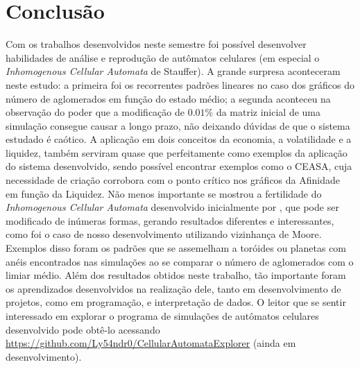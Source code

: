 \documentclass[
	12pt,				%
	openright,			%
	twoside,			%
	a4paper,			%
	english,			%
	french,				%
	spanish,			%
	brazil				%
	]{abntex2}
\begin{document}

\chapter{Conclusão}

Com os trabalhos desenvolvidos neste semestre foi possível desenvolver habilidades de análise e reprodução de autômatos celulares (em especial o \textit{Inhomogenous Cellular Automata} de Stauffer). A grande surpresa aconteceram neste estudo: a primeira foi os recorrentes padrões lineares no caso dos gráficos do número de aglomerados em função do estado médio; a segunda aconteceu na observação do poder que a modificação de $0.01\%$ da matriz inicial de uma simulação consegue causar a longo prazo, não deixando dúvidas de que o sistema estudado é caótico. A aplicação em dois conceitos da economia, a volatilidade e a liquidez, também serviram quase que perfeitamente como exemplos da aplicação do sistema desenvolvido, sendo possível encontrar exemplos como o CEASA, cuja necessidade de criação corrobora com o ponto crítico nos gráficos da Afinidade em função da Liquidez. Não menos importante se mostrou a fertilidade do \textit{Inhomogenous Cellular Automata} desenvolvido inicialmente por , que pode ser modificado de inúmeras formas, gerando resultados diferentes e interessantes, como foi o caso de nosso desenvolvimento utilizando vizinhança de Moore. Exemplos disso foram os padrões que se assemelham a toróides ou planetas com anéis encontrados nas simulações ao se comparar o número de aglomerados com o limiar médio. Além dos resultados obtidos neste trabalho, tão importante foram os aprendizados desenvolvidos na realização dele, tanto em desenvolvimento de projetos, como em programação, e interpretação de dados. O leitor que se sentir interessado em explorar o programa de simulações de autômatos celulares desenvolvido pode obtê-lo acessando \url{https://github.com/Ly54ndr0/CellularAutomataExplorer} (ainda em desenvolvimento).

\postextual
\end{document}
